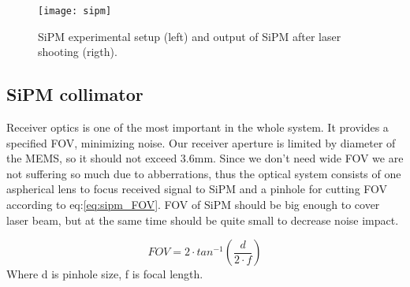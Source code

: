 \begin{figure}[H]
\texttt{[image: sipm]}
\caption{SiPM experimental setup (left) and output of SiPM after laser shooting (rigth).}
\label{fig:sipm_pde}
\end{figure}



\subsection{SiPM collimator}
Receiver optics is one of the most important in the whole system. It provides a specified FOV, minimizing noise. Our receiver aperture is limited by diameter of the MEMS, so it should not exceed 3.6mm.
Since we don't need wide FOV we are not suffering so much due to abberrations, thus the optical system consists of one aspherical lens to focus received signal to SiPM and a pinhole for cutting FOV according to eq:\ref{eq:sipm_FOV}.
FOV of SiPM should be big enough to cover laser beam, but at the same time should be quite small to decrease noise impact.


\begin{equation}\label{eq:sipm_FOV}
FOV = 2\cdot tan^{-1}(\frac{d}{2\cdot f})
\end{equation}
Where d is pinhole size, f is focal length.



\begin{figure}[h]
\begin{floatrow}
\end{floatrow}
\end{figure}

